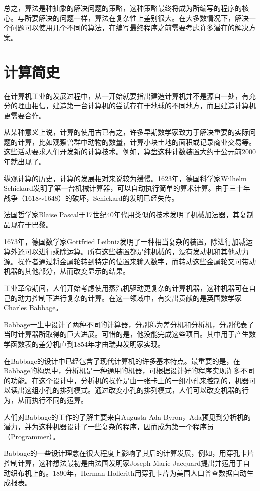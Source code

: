 总之，算法是种抽象的解决问题的策略，这种策略最终将成为所编写的程序的核心。与所要解决的问题一样，算法在复杂性上差别很大。在大多数情况下，解决一个问题可以使用几个不同的算法，在编写最终程序之前需要考虑许多潜在的解决方案。


\chapter{计算简史}

在计算机工业的发展过程中，从一开始就要指出建造计算机并不是源自一处，有充分的理由相信，建造第一台计算机的尝试存在于地球的不同地方，而且建造计算机更需要合作。

从某种意义上说，计算的使用古已有之，许多早期数学家致力于解决重要的实际问题的计算，比如观察兽群中动物的数量，计算小块土地的面积或记录商业交易等。这些活动要求人们开发新的计算技术。例如，算盘这种计数装置大约于公元前2000年就出现了。

纵观计算的历史，计算的发展相对来说较为缓慢。1623年，德国科学家Wilhelm Schickard发明了第一台机械计算器，可以自动执行简单的算术计算。由于三十年战争（1618$\sim$1648）的破坏，Schickard的发明已经失传。

法国哲学家Blaise Pascal于17世纪40年代用类似的技术发明了机械加法器，其复制品现存于巴黎。

1673年，德国数学家Gottfried Leibniz发明了一种相当复杂的装置，除进行加减运算外还可以进行乘除运算。所有这些装置都是纯机械的，没有发动机和其他动力源。操作者通过将金属轮转到特定的位置来输入数字，而转动这些金属轮又可带动机器的其他部分，从而改变显示的结果。

工业革命期间，人们开始考虑使用蒸汽机驱动更复杂的计算机器，这种机器可在自己的动力控制下进行复杂的计算。在这一领域中，有突出贡献的是英国数学家Charles Babbage。

Babbage一生中设计了两种不同的计算器，分别称为差分机和分析机，分别代表了当时计算器所取得的巨大进展。可惜的是，他没能完成这些项目。其中用于产生数学函数表的差分机直到1854年才由瑞典发明家实现。

在Babbage的设计中已经包含了现代计算机的许多基本特点。最重要的是，在Babbage的构思中，分析机是一种通用的机器，可根据设计好的程序实现许多不同的功能。在这个设计中，分析机的操作是由一张卡上的一组小孔来控制的，机器可以读出这组小孔的排列模式。通过改变小孔的排列模式，人们可以改变机器的行为，从而执行不同的运算。

人们对Babbage的工作的了解主要来自Augusta Ada Byron，Ada预见到分析机的潜力，并为这种机器设计了一些复杂的程序，因而成为第一个程序员（Programmer）。

Babbage的一些设计理念在很大程度上影响了其后的计算发展，例如，用穿孔卡片控制计算，这种想法最初是由法国发明家Joseph Marie Jacquard提出并运用于自动织布机上的。1890年，Herman Hollerith用穿孔卡片为美国人口普查数据自动生成报表。

